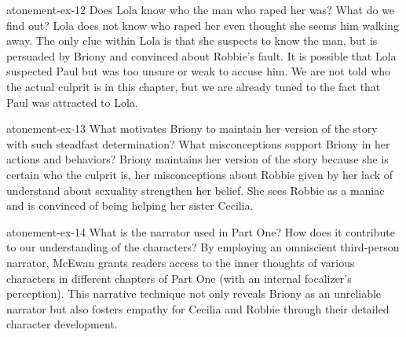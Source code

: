 \documentclass[preview]{standalone}
\begin{document}
\begin{snippetexercise}{atonement-ex-12}%
    {Does Lola know who the man who raped her was? What do we find out?}
    Lola does not know who raped her even thought she seems him walking away.
    The only clue within Lola is that she suspects to know the man, but is
    persuaded by Briony and convinced about Robbie's fault.
    It is possible that Lola suspected Paul but was too unsure or weak to accuse him.
    We are not told who the actual culprit is in this chapter,
    but we are already tuned to the fact that Paul was attracted to Lola.
\end{snippetexercise}

\begin{snippetexercise}{atonement-ex-13}%
    {What motivates Briony to maintain her version of the story with such steadfast determination?
    What misconceptions support Briony in her actions and behaviors?}
    Briony maintains her version of the story because she is certain who the culprit is,
    her misconceptions about Robbie given by her lack of understand about sexuality
    strengthen her belief.
    She sees Robbie as a maniac and is convinced of being helping her sister Cecilia.
\end{snippetexercise}

\begin{snippetexercise}{atonement-ex-14}{
    What is the narrator used in Part One? How does it contribute to our understanding of the
characters? }
    By employing an omniscient third-person narrator, McEwan grants readers
    access to the inner thoughts of various characters in different chapters of Part One
    (with an internal focalizer's perception).
    This narrative technique not only reveals Briony as an unreliable
    narrator but also fosters empathy for Cecilia and Robbie
    through their detailed character development.
\end{snippetexercise}
\end{document}
